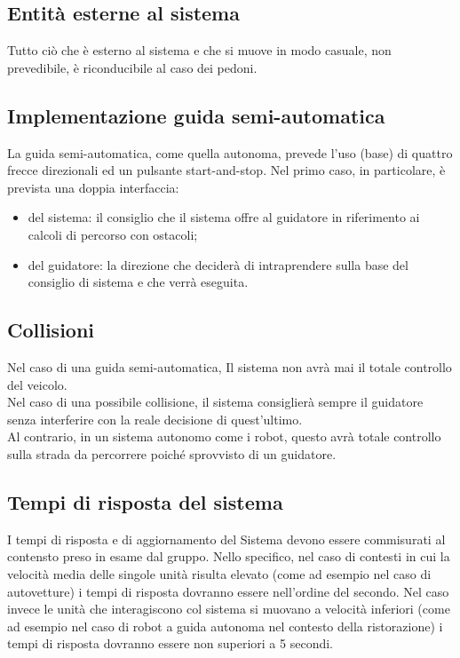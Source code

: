 \documentclass[]{article}
\begin{document}
		\subsection{Entità esterne al sistema}
		Tutto ciò che è esterno al sistema e che si muove in modo casuale, non prevedibile, è riconducibile al caso dei pedoni.

		\subsection{Implementazione guida semi-automatica}
		La guida semi-automatica, come quella autonoma, prevede l'uso (base) di quattro frecce direzionali ed un pulsante start-and-stop.
		Nel primo caso, in particolare, è prevista una doppia interfaccia:
		\begin{itemize}
			\item del sistema: il consiglio che il sistema offre al guidatore in riferimento ai calcoli di percorso con ostacoli;
			\item del guidatore: la direzione che deciderà di intraprendere sulla base del consiglio di sistema e che verrà eseguita.
		\end{itemize}


		\subsection{Collisioni}
		Nel caso di una guida semi-automatica, Il sistema non avrà mai il totale controllo del veicolo.\\
		Nel caso di una possibile collisione, il sistema consiglierà sempre il guidatore senza interferire con la reale decisione di quest'ultimo. \\
		Al contrario, in un sistema autonomo come i robot, questo avrà totale controllo sulla strada da percorrere poiché sprovvisto di un guidatore.

		\subsection{Tempi di risposta del sistema}
		I tempi di risposta e di aggiornamento del Sistema devono essere commisurati al contensto preso in esame dal gruppo. Nello specifico, nel caso di contesti
		in cui la velocità media delle singole unità risulta elevato (come ad esempio nel caso di autovetture) i tempi di risposta dovranno essere nell'ordine del secondo.
		Nel caso invece le unità che interagiscono col sistema si muovano a velocità inferiori (come ad esempio nel caso di robot a guida autonoma nel
		contesto della ristorazione) i tempi di risposta dovranno essere non superiori a 5 secondi.
\end{document}
